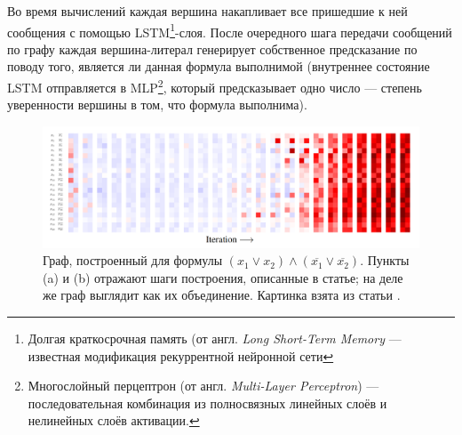 Во время вычислений каждая вершина накапливает все пришедшие к ней сообщения с помощью LSTM\footnote{Долгая краткосрочная память (от англ. \textit{Long Short-Term Memory} --- известная модификация рекуррентной нейронной сети}-слоя. После очередного шага передачи сообщений по графу каждая вершина-литерал генерирует собственное предсказание по поводу того, является ли данная формула выполнимой (внутреннее состояние LSTM отправляется в MLP\footnote{Многослойный перцептрон (от англ. \textit{Multi-Layer Perceptron}) --- последовательная комбинация из полносвязных линейных слоёв и нелинейных слоёв активации.}, который предсказывает одно число --- степень уверенности вершины в том, что формула выполнима).

\begin{figure}[ht]
\begin{center}
    \includegraphics[scale=0.24]{./assets/neurosat-voting.png}
    \caption{\label{neurosat-voting} Граф, построенный для формулы $(x_1 \vee x_2) \wedge (\overline{x_1} \vee \overline{x_2})$. Пункты (a) и (b) отражают шаги построения, описанные в статье; на деле же граф выглядит как их объединение. Картинка взята из статьи \cite{neurosat-paper}.}
\end{center}
\end{figure}




